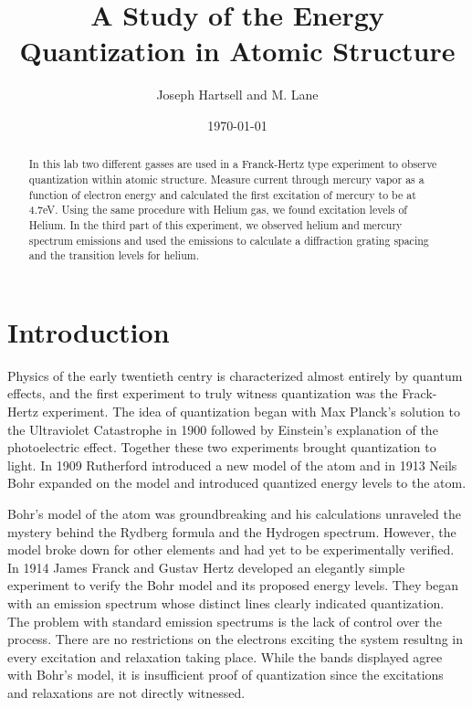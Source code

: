 \documentclass[12pt,twocolumn]{article}
\begin{document}
\title{A Study of the Energy Quantization in Atomic Structure}
\author{Joseph Hartsell and M. Lane}
\date{\today}

\maketitle


\begin{abstract}
	In this lab two different gasses are used in a Franck-Hertz type experiment to observe quantization within atomic structure. Measure current through mercury vapor as a function of electron energy and calculated the first excitation of mercury to be at 4.7eV. Using the same procedure with Helium gas, we found excitation levels of Helium. In the third part of this experiment, we observed helium and mercury spectrum emissions and used the emissions to calculate a diffraction grating spacing and the transition levels for helium.
\end{abstract}

\section{Introduction}

Physics of the early twentieth centry is characterized almost entirely by quantum effects, and the first experiment to truly witness quantization was the Frack-Hertz experiment. The idea of quantization began with Max Planck's solution to the Ultraviolet Catastrophe in 1900 followed by Einstein's explanation of the photoelectric effect. Together these two experiments brought quantization to light. In 1909 Rutherford introduced a new model of the atom and in 1913 Neils Bohr expanded on the model and introduced quantized energy levels to the atom.

Bohr's model of the atom was groundbreaking and his calculations unraveled the mystery behind the Rydberg formula and the Hydrogen spectrum. However, the model broke down for other elements and had yet to be experimentally verified. In 1914 James Franck and Gustav Hertz developed an elegantly simple experiment to verify the Bohr model and its proposed energy levels. They began with an emission spectrum whose distinct lines clearly indicated quantization. The problem with standard emission spectrums is the lack of control over the process. There are no restrictions on the electrons exciting the system resultng in every excitation and relaxation taking place. While the bands displayed agree with Bohr's model, it is insufficient proof of quantization since the excitations and relaxations are not directly witnessed.
\end{document}
